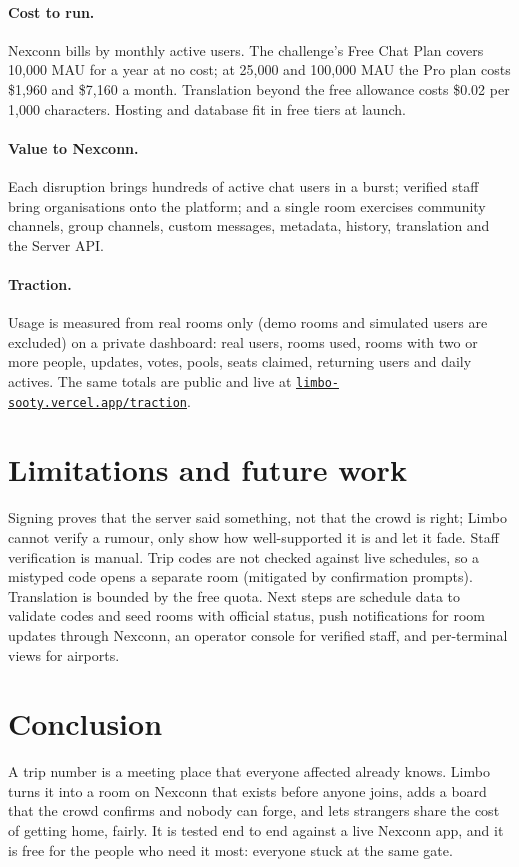 \documentclass[10pt,twocolumn]{article}
\newcommand{\code}[1]{\texttt{\small #1}}
\begin{document}
\paragraph{Cost to run.} Nexconn bills by monthly active users. The challenge's Free Chat Plan covers 10{,}000 MAU for
a year at no cost; at 25{,}000 and 100{,}000 MAU the Pro plan costs \$1{,}960 and \$7{,}160 a month. Translation beyond
the free allowance costs \$0.02 per 1{,}000 characters. Hosting and database fit in free tiers at launch.

\paragraph{Value to Nexconn.} Each disruption brings hundreds of active chat users in a burst; verified staff bring
organisations onto the platform; and a single room exercises community channels, group channels, custom messages,
metadata, history, translation and the Server API.

\paragraph{Traction.} Usage is measured from real rooms only (demo rooms and simulated users are excluded) on a private
dashboard: real users, rooms used, rooms with two or more people, updates, votes, pools, seats claimed, returning
users and daily actives. The same totals are public and live at \href{https://limbo-sooty.vercel.app/traction}{\code{limbo-sooty.vercel.app/traction}}.

\section{Limitations and future work}
Signing proves that the server said something, not that the crowd is right; Limbo cannot verify a rumour, only show how
well-supported it is and let it fade. Staff verification is manual. Trip codes are not checked against live schedules,
so a mistyped code opens a separate room (mitigated by confirmation prompts). Translation is bounded by the free quota.
Next steps are schedule data to validate codes and seed rooms with official status, push notifications for room
updates through Nexconn, an operator console for verified staff, and per-terminal views for airports.

\section{Conclusion}
A trip number is a meeting place that everyone affected already knows. Limbo turns it into a room on Nexconn that
exists before anyone joins, adds a board that the crowd confirms and nobody can forge, and lets strangers share the cost
of getting home, fairly. It is tested end to end against a live Nexconn app, and it is free for the people who need it
most: everyone stuck at the same gate.
\end{document}
